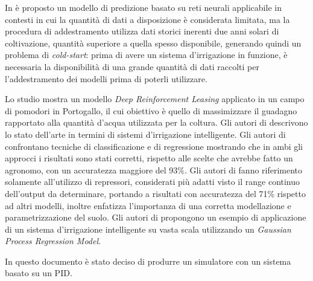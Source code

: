 \documentclass[12pt,a4paper,openright,twoside, openany]{book}
\begin{document}
In \cite{Gonzalez2019} è proposto un modello di predizione basato su reti neurali applicabile in contesti in cui la quantità di dati a disposizione è considerata limitata, ma la procedura di addestramento utilizza dati storici inerenti due anni solari di coltivazione, quantità superiore a quella spesso disponibile, generando quindi un problema di \textit{cold-start}: prima di avere un sistema d'irrigazione in funzione, è necessaria la disponibilità di una grande quantità di dati raccolti per l'addestramento dei modelli prima di poterli utilizzare.

Lo studio \cite{Alibaei2022} mostra un modello \textit{Deep Reinforcement Leasing} applicato in un campo di pomodori in Portogallo, il cui obiettivo è quello di massimizzare il guadagno rapportato alla quantità d'acqua utilizzata per la coltura.  Gli autori di \cite{García2020, Emmanuel2022} descrivono lo stato dell'arte in termini di sistemi d'irrigazione intelligente.
Gli autori di \cite{Goldstein2017} confrontano tecniche di classificazione e di regressione mostrando che in ambi gli approcci i risultati sono stati corretti, rispetto alle scelte che avrebbe fatto un agronomo, con un accuratezza maggiore del 93\%. Gli autori di \cite{Sidhu2020} fanno riferimento solamente all'utilizzo di repressori, considerati più adatti visto il range continuo dell'output da determinare, portando a risultati con accuratezza del 71\% rispetto ad altri modelli, inoltre enfatizza l'importanza di una corretta modellazione e parametrizzazione del suolo. Gli autori di \cite{Emami2022} propongono un esempio di applicazione di un sistema d'irrigazione intelligente su vasta scala utilizzando un \textit{Gaussian Process Regression Model}.

In questo documento è stato deciso di produrre un simulatore con un sistema basato su un \ac{PID}.



\end{document}
